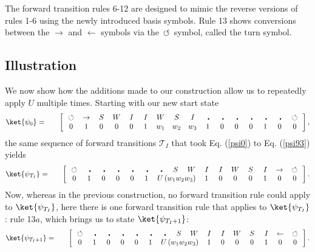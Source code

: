 \documentclass[11pt,letterpaper]{article}
\newcommand{\<}{\langle}
\renewcommand{\>}{\rangle}
\newcommand{\tur}{\,\circlearrowleft\,}   %
\newcommand{\bul}{\:\:\centerdot\:}       %
\newcommand{\iga}{\:I\,}                  %
\newcommand{\wga}{W}						%
\newcommand{\sga}{\:S\,}					%
\begin{document}
The forward transition rules 6-12 are designed to mimic the reverse versions of rules 1-6 using the newly introduced basis symbols. Rule 13 shows conversions between the $\rightarrow$ and $\leftarrow$ symbols via the $\tur$ symbol, called the turn symbol.

\subsection{Illustration}
We now show how the additions made to our construction allow us to repeatedly apply $U$ multiple times. Starting with our new start state
\begin{eqnarray}
	\ket{\psi_{0}} &=& \quad \left[ \begin{array}{cccccccccccccccc}
		\tur & \rightarrow & \sga & \wga & \iga & \iga & 
		\wga & \sga & \iga & \bul &
		\bul & \bul & \bul & \bul & \bul & \tur
		\\		
		0 & 1    & 0    & 0    & 0    & 1    & 
		w_1 & w_2 & w_3
		 &
		1    & 0    & 0    & 0    & 1	& 0	& 0
 	\end{array} \right], \label{psi02}
\end{eqnarray}
the same sequence of forward transitions $\mathcal{T}_{I}$ that took Eq. (\ref{psi0}) to Eq. (\ref{psi93}) yields
\begin{eqnarray}
	\ket{\psi_{T_I}} &=& \quad \left[ \begin{array}{cccccccccccccccc}
		\tur & \bul & \bul &  
		\bul & \bul & \bul & \bul & \sga & \wga & \iga & \iga & 
		\wga & \sga & \iga & \rightarrow & \tur
		\\		
		0 & 1    & 0    & 0    & 0    & 1    & 
		\multicolumn{3}{c}{U\left(w_1w_2w_3\right)}
		 &
		1    & 0    & 0    & 0    & 1	& 0 & 0
 	\end{array} \right]. \label{endstate2}
\end{eqnarray}
Now, whereas in the previous construction, no forward transition rule could apply to $\ket{\psi_{T_I}}$, here there is one forward transition rule that applies to $\ket{\psi_{T_I}}$: rule 13$a$, which brings us to state $\ket{\psi_{T_I+1}}$:
\begin{eqnarray}
	\ket{\psi_{T_I+1}} &=& \quad \left[ \begin{array}{cccccccccccccccc}
		\tur & \bul & \bul &  
		\bul & \bul & \bul & \bul & \sga & \wga & \iga & \iga & 
		\wga & \sga & \iga & \leftarrow & \tur
		\\		
		0 & 1    & 0    & 0    & 0    & 1    & 
		\multicolumn{3}{c}{U\left(w_1w_2w_3\right)}
		 &
		1    & 0    & 0    & 0    & 1	& 0 & 0
 	\end{array} \right]. \label{psitp1}
\end{eqnarray}
\end{document}
